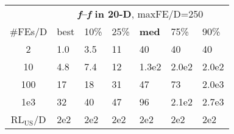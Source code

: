 \begin{tabular}{c|llllll}
 & \multicolumn{6}{|c}{\textbf{\textit{f}\raisebox{-0.35ex}{1}--\textit{f}\raisebox{-0.35ex}{24} in 20-D}, maxFE/D=250}\\
\#FEs/D & best & 10\% & 25\% & \textbf{med} & 75\% & 90\%\\
2 & \hspace*{1ex}1.0 & \hspace*{1ex}3.5 & 11 & 40 & 40 & 40\\
10 & \hspace*{1ex}4.8 & \hspace*{1ex}7.4 & 12 & 1.3e2 & 2.0e2 & 2.0e2\\
100 & 17 & 18 & 31 & 47 & 73 & 2.0e3\\
1e3 & 32 & 40 & 47 & 96 & 2.1e2 & 2.7e3\\
$\text{RL}_{\text{US}}$/D & 2e2 & 2e2 & 2e2 & 2e2 & 2e2 & 2e2
\end{tabular}
